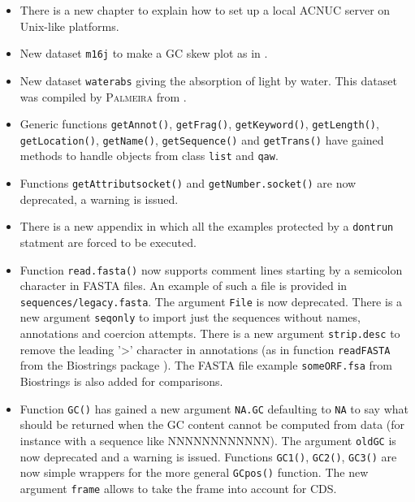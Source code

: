\documentclass{article}
\begin{document}
\begin{itemize}

\item There is a new chapter to explain how to set up a
  local ACNUC server on Unix-like platforms.

\item New dataset \texttt{m16j} to make a GC skew plot as in
  \cite{LobryMBE96}.

\item New dataset \texttt{waterabs} giving the absorption of light 
  by water. This dataset was compiled by \textsc{Palmeira} \cite{PalmeiraL2007}
  from \cite{LitjensRA1999, QuickendenTI1980}.

\item Generic functions \texttt{getAnnot()}, \texttt{getFrag()},
  \texttt{getKeyword()}, \texttt{getLength()}, \texttt{getLocation()},
  \texttt{getName()}, \texttt{getSequence()} and \texttt{getTrans()}
  have gained methods to handle objects from class \texttt{list}
  and \texttt{qaw}.

\item Functions \texttt{getAttributsocket()} and \texttt{getNumber.socket()}
  are now deprecated, a warning is issued.

\item There is a new appendix in which all the examples protected
  by a \texttt{dontrun} statment are forced to be executed.

\item Function \texttt{read.fasta()} now supports comment lines
  starting by a semicolon character in FASTA files. An example
  of such a file is provided in \texttt{sequences/legacy.fasta}.
  The argument \texttt{File} is now deprecated. There is
  a new argument \texttt{seqonly} to import just the sequences
  without names, annotations and coercion attempts. There is
  a new argument \texttt{strip.desc} to remove the leading
  '>' character in annotations (as in function \texttt{readFASTA}
  from the Biostrings package \cite{Biostrings}). The FASTA file
  example \texttt{someORF.fsa} from Biostrings is also added
  for comparisons.

\item Function \texttt{GC()} has gained a new argument \texttt{NA.GC}
  defaulting to \texttt{NA} to say what should be returned when the
  GC content cannot be computed from data (for instance with a
  sequence like NNNNNNNNNNNN). The argument \texttt{oldGC} is now
  deprecated and a warning is issued. Functions \texttt{GC1()},
  \texttt{GC2()}, \texttt{GC3()} are now simple wrappers for the
  more general \texttt{GCpos()} function. The new argument \texttt{frame}
  allows to take the frame into account for CDS.


\end{itemize}
\end{document}

